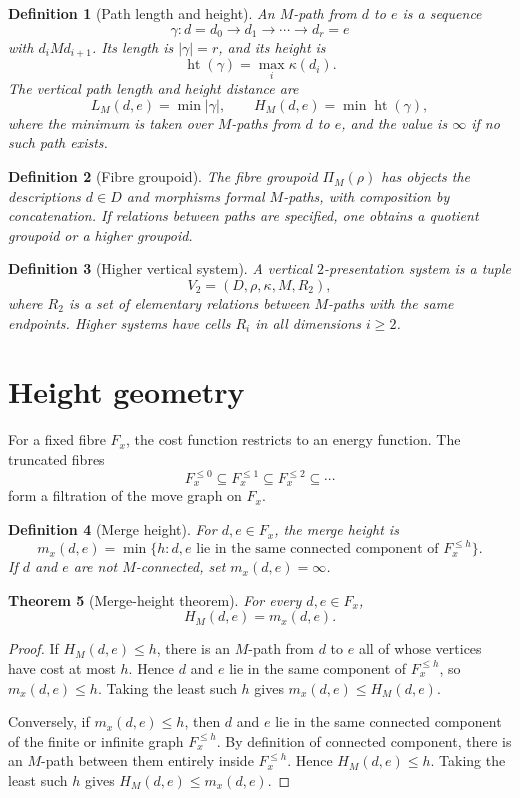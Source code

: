 \documentclass[11pt]{article}
\newtheorem{theorem}{Theorem}[section]
\newtheorem{definition}[theorem]{Definition}
\begin{document}
\begin{definition}[Path length and height]
An \(M\)-path from \(d\) to \(e\) is a sequence
\[
\gamma:d=d_0\to d_1\to\cdots\to d_r=e
\]
with \(d_iMd_{i+1}\).  Its length is \(|\gamma|=r\), and its height is
\[
\operatorname{ht}(\gamma)=\max_i\kappa(d_i).
\]
The vertical path length and height distance are
\[
L_M(d,e)=\min |\gamma|,
\qquad
H_M(d,e)=\min \operatorname{ht}(\gamma),
\]
where the minimum is taken over \(M\)-paths from \(d\) to \(e\), and the value is \(\infty\) if no such path exists.
\end{definition}

\begin{definition}[Fibre groupoid]
The fibre groupoid \(\Pi_M(\rho)\) has objects the descriptions \(d\in D\) and morphisms formal \(M\)-paths, with composition by concatenation.  If relations between paths are specified, one obtains a quotient groupoid or a higher groupoid.
\end{definition}

\begin{definition}[Higher vertical system]
A vertical \(2\)-presentation system is a tuple
\[
V_2=(D,\rho,\kappa,M,R_2),
\]
where \(R_2\) is a set of elementary relations between \(M\)-paths with the same endpoints.  Higher systems have cells \(R_i\) in all dimensions \(i\ge2\).
\end{definition}

\section{Height geometry}

For a fixed fibre \(F_x\), the cost function restricts to an energy function.  The truncated fibres
\[
F_x^{\le0}\subseteq F_x^{\le1}\subseteq F_x^{\le2}\subseteq\cdots
\]
form a filtration of the move graph on \(F_x\).

\begin{definition}[Merge height]
For \(d,e\in F_x\), the merge height is
\[
m_x(d,e)=\min\{h:d,e\text{ lie in the same connected component of }F_x^{\le h}\}.
\]
If \(d\) and \(e\) are not \(M\)-connected, set \(m_x(d,e)=\infty\).
\end{definition}

\begin{theorem}[Merge-height theorem]
For every \(d,e\in F_x\),
\[
H_M(d,e)=m_x(d,e).
\]
\end{theorem}

\begin{proof}
If \(H_M(d,e)\le h\), there is an \(M\)-path from \(d\) to \(e\) all of whose vertices have cost at most \(h\).  Hence \(d\) and \(e\) lie in the same component of \(F_x^{\le h}\), so \(m_x(d,e)\le h\).  Taking the least such \(h\) gives \(m_x(d,e)\le H_M(d,e)\).

Conversely, if \(m_x(d,e)\le h\), then \(d\) and \(e\) lie in the same connected component of the finite or infinite graph \(F_x^{\le h}\).  By definition of connected component, there is an \(M\)-path between them entirely inside \(F_x^{\le h}\).  Hence \(H_M(d,e)\le h\).  Taking the least such \(h\) gives \(H_M(d,e)\le m_x(d,e)\).
\end{proof}
\end{document}
